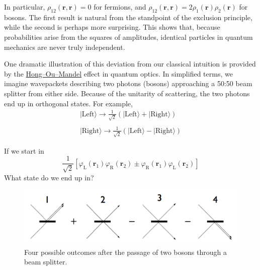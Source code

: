 \documentclass[
  letterpaper,
  DIV=11,
  numbers=noendperiod]{scrreprt}
\begin{document}
In particular, \(\rho_{12}(\mathbf{r},\mathbf{r}) = 0\) for fermions,
and
\(\rho_{12}(\mathbf{r},\mathbf{r}) = 2\rho_1(\mathbf{r})\rho_2(\mathbf{r})\)
for bosons. The first result is natural from the standpoint of the
exclusion principle, while the second is perhaps more surprising. This
shows that, because probabilities arise from the squares of amplitudes,
identical particles in quantum mechanics are never truly independent.

One dramatic illustration of this deviation from our classical intuition
is provided by the
\href{https://en.wikipedia.org/wiki/Hong\%E2\%80\%93Ou\%E2\%80\%93Mandel_effect}{Hong--Ou--Mandel}
effect in quantum optics. In simplified terms, we imagine wavepackets
describing two photons (bosons) approaching a 50:50 beam splitter from
either side. Because of the unitarity of scattering, the two photons end
up in orthogonal states. For example, \[
\begin{align}
\lvert{\text{Left}}\rangle\to\frac{1}{\sqrt{2}}\left(\lvert{\text{Left}}\rangle+ \lvert{\text{Right}}\rangle\right)\\\\
\lvert{\text{Right}}\rangle\to\frac{1}{\sqrt{2}}\left(\lvert{\text{Left}}\rangle- \lvert{\text{Right}}\rangle\right)
\end{align}
\]

\begin{tcolorbox}[enhanced jigsaw, colback=white, bottomrule=.15mm, left=2mm, colbacktitle=quarto-callout-tip-color!10!white, breakable, colframe=quarto-callout-tip-color-frame, leftrule=.75mm, opacitybacktitle=0.6, opacityback=0, bottomtitle=1mm, toptitle=1mm, titlerule=0mm, title=\textcolor{quarto-callout-tip-color}{\faLightbulb}\hspace{0.5em}{Check}, toprule=.15mm, arc=.35mm, coltitle=black, rightrule=.15mm]

If we start in \[
\frac{1}{\sqrt{2}}[\varphi_\text{L}(\mathbf{r}_1)\varphi_\text{R}(\mathbf{r}_2)\pm \varphi_\text{R}(\mathbf{r}_1)\varphi_\text{L}(\mathbf{r}_2)]
\] What state do we end up in?

\end{tcolorbox}

\begin{figure}[H]

{\centering \includegraphics{../assets/HOM.png}

}

\caption{Four possible outcomes after the passage of two bosons through
a beam splitter.}

\end{figure}%
\end{document}
